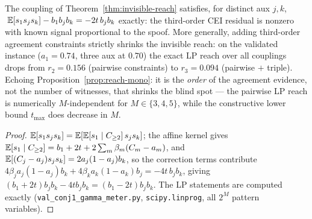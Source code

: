 \begin{proposition}\label{prop:third-order}
The coupling of Theorem~\ref{thm:invisible-reach} satisfies, for distinct aux
$j,k$,
$\;\mathbb{E}[s_1s_js_k]-b_1b_jb_k=-2t\,b_jb_k$ exactly: the third-order CEI residual
is nonzero with known signal proportional to the spoof. More generally,
adding third-order agreement constraints strictly shrinks the invisible
reach: on the validated instance ($a_1{=}0.74$, three aux at $0.70$) the
exact LP reach over all couplings drops from $r_2=0.156$ (pairwise
constraints) to $r_3=0.094$ (pairwise $+$ triple). Echoing
Proposition~\ref{prop:reach-mono}: it is the \emph{order} of the
agreement evidence, not the number of witnesses, that shrinks the blind spot
--- the pairwise LP reach is numerically $M$-independent for $M\in\{3,4,5\}$,
while the constructive lower bound $t_{\max}$ does decrease in $M$.
\end{proposition}
\begin{proof}
$\mathbb{E}[s_1s_js_k]=\mathbb{E}[\mathbb{E}[s_1\mid C_{\ge2}]\,s_js_k]$; the affine kernel gives
$\mathbb{E}[s_1\mid C_{\ge2}]=b_1+2t+2\sum_m\beta_m(C_m-a_m)$, and
$\mathbb{E}[(C_j-a_j)s_js_k]=2a_j(1-a_j)b_k$, so the correction terms contribute
$4\beta_ja_j(1-a_j)b_k+4\beta_ka_k(1-a_k)b_j=-4t\,b_jb_k$, giving
$(b_1+2t)b_jb_k-4tb_jb_k=(b_1-2t)b_jb_k$. The LP statements are computed
exactly (\texttt{val\_conj1\_gamma\_meter.py}, \texttt{scipy.linprog}, all
$2^M$ pattern variables).
\end{proof}

